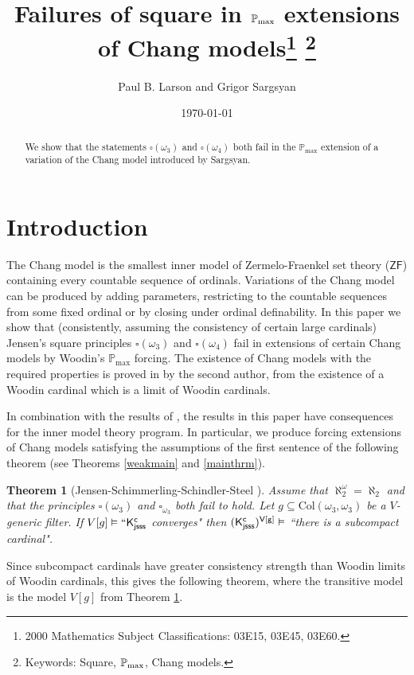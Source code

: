 \documentclass[12pt]{article}
\title{Failures of square in $\pmax$ extensions of Chang models\thanks{2000 Mathematics Subject Classifications:
03E15, 03E45, 03E60.}
\thanks{Keywords: Square, $\pmax$, Chang models.}}
\author{Paul B. Larson and Grigor Sargsyan}
\date{\today}
\newtheorem{theorem}{Theorem}[section]
\renewcommand{\models}{\vDash}
\newcommand{\pmax}{\mathbb{P}_{\mathrm{max}}}
\newcommand{\ZF}{\mathsf{ZF}}
\newcommand{\Col}{\mathrm{Col}}
\begin{document}
\maketitle

\begin{abstract}
We show that the statements $\square(\omega_{3})$ and $\square(\omega_{4})$ both fail in the $\pmax$ extension of a variation of the Chang model introduced by Sargsyan.
\end{abstract}




\section{Introduction}

The Chang model \cite{Chang} is the smallest inner model of Zermelo-Fraenkel set theory ($\ZF$) containing every countable sequence of ordinals. Variations of the Chang model can be produced by adding parameters, restricting to the countable sequences from some fixed ordinal or by closing under ordinal definability. In this paper we show that (consistently, assuming the consistency of certain large cardinals) Jensen's square principles $\square(\omega_{3})$ and $\square(\omega_{4})$ fail in extensions of certain Chang models by Woodin's $\pmax$ forcing. The existence of Chang models with the required properties is proved in \cite{Changmodels_1} by the second author, from the existence of a Woodin cardinal which is a limit of Woodin cardinals.

In combination with the results of \cite{Changmodels_1}, the results in this paper have consequences for the inner model theory program.
In particular, we produce forcing extensions of Chang models satisfying the assumptions of the first sentence of the following theorem (see Theorems \ref{weakmain} and \ref{mainthrm}).

\begin{theorem}[Jensen-Schimmerling-Schindler-Steel \cite{JSSS}]\label{JSSSthrm} Assume that $\aleph_2^\omega=\aleph_2$ and that the principles $\square(\omega_3)$ and $\square_{\omega_3}$ both fail to hold. Let $g\subseteq \Col(\omega_3, \omega_3)$ be a $V$-generic filter. If $V[g]\models ``\sf{K}^c_{jsss}$ converges" then $(\sf{K}^c_{jsss})^{V[g]}\models$ ``there is a subcompact cardinal".
\end{theorem}

Since subcompact cardinals have greater consistency strength than Woodin limits of Woodin cardinals, this gives the following theorem, where the transitive model is the model $V[g]$ from Theorem \ref{JSSSthrm}.
\end{document}

